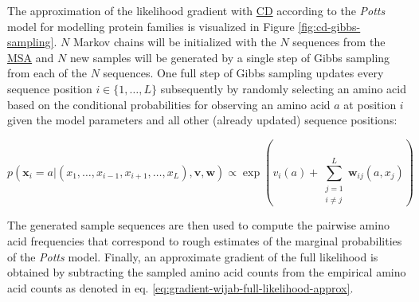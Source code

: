 \documentclass[11pt,a4paper,twoside]{book}
\newcommand{\seq}{\mathbf{x}}
\renewcommand{\v}{\mathbf{v}}
\newcommand{\vi}{v_{i}}
\newcommand{\w}{\mathbf{w}}
\newcommand{\wij}{\mathbf{w}_{ij}}
\theoremstyle{definition}
\theoremstyle{definition}
\theoremstyle{remark}
\begin{document}
The approximation of the likelihood gradient with
\protect\hyperlink{abbrev}{CD} according to the \emph{Potts} model for
modelling protein families is visualized in Figure
\ref{fig:cd-gibbs-sampling}. \(N\) Markov chains will be initialized
with the \(N\) sequences from the \protect\hyperlink{abbrev}{MSA} and
\(N\) new samples will be generated by a single step of Gibbs sampling
from each of the \(N\) sequences. One full step of Gibbs sampling
updates every sequence position \(i \in \{1, \ldots, L\}\) subsequently
by randomly selecting an amino acid based on the conditional
probabilities for observing an amino acid \(a\) at position \(i\) given
the model parameters and all other (already updated) sequence positions:

\begin{equation}
  p(\seq_i = a | (x_1, \ldots, x_{i-1}, x_{i+1}, \ldots, x_L), \v, \w) \propto \exp \left( \vi(a) + \sum_{\substack{j=1 \\ i \ne j}}^L \wij(a, x_j)  \right)
\label{eq:conditional-prob-full-likelihood}
\end{equation}

The generated sample sequences are then used to compute the pairwise
amino acid frequencies that correspond to rough estimates of the
marginal probabilities of the \emph{Potts} model. Finally, an
approximate gradient of the full likelihood is obtained by subtracting
the sampled amino acid counts from the empirical amino acid counts as
denoted in eq. \eqref{eq:gradient-wijab-full-likelihood-approx}.
\end{document}
